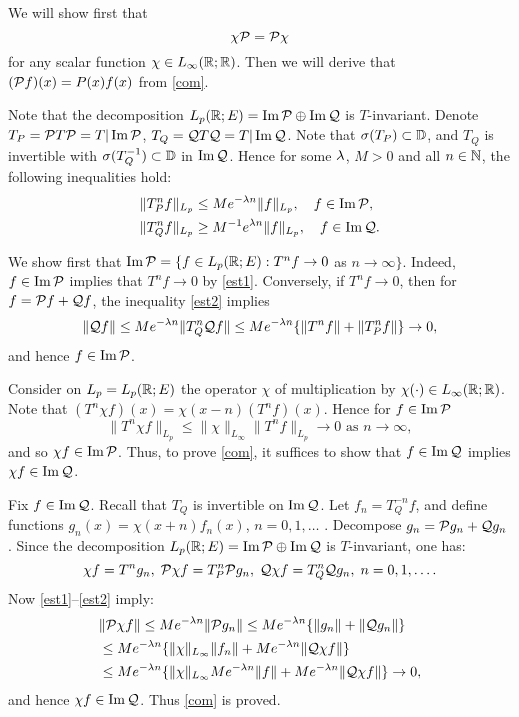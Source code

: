 \begin{pf}
We will show first that
\begin{equation}
\chi \calP =\calP\chi
\lb{com}
\end{equation}
for any scalar function $\chi \in L_\infty ({\Bbb{R}}; {\Bbb{R}})$.
Then we will derive
that $({\cal{P}} f)(x) =P(x)f(x)$ from \eqref{com}.

Note that the
decomposition $L_p({\Bbb{R}};E)=\operatorname{Im} {\cal{P}} \oplus \operatorname{Im} {\cal{Q}}$ is $T$-invariant.
Denote $T_P ={\cal{P}} T{\cal{P}} =T| \operatorname{Im} {\cal{P}}$,
$T_Q ={\cal{Q}} T{\cal{Q}}=T| \operatorname{Im} {\cal{Q}}$.  Note that
$\sigma (T_P) \subset {\Bbb{D}}$, and $T_Q$ is invertible with $\sigma
(T^{-1}_Q) \subset {\Bbb{D}}$ in $\operatorname{Im} {\cal{Q}}$.
Hence for some $\lambda$, $M> 0$ and all $n\in {\Bbb{N}}$,
the following inequalities hold:
\begin{align}
\| T_P^n f\|_{L_p} & \leq Me^{-\lam n} \|f\|_{L_p}, \quad f\in \Im \calP,
\lb{est1}\\
\| T_Q^n f\|_{L_p} & \geq M^{-1} e^{\lam n} \| f\|_{L_p}, \quad f\in \Im
\calQ.
\lb{est2}
\end{align}

We show first that $\operatorname{Im} {\cal{P}} =\{f\in L_p ({\Bbb{R}};E): T^n f\to 0$ as $n\to
\infty\}$.  Indeed, $f\in \operatorname{Im} {\cal{P}}$ implies that
$T^n f\to 0$ by \eqref{est1}.
Conversely, if $T^n f\to 0$, then for
$f={\cal{P}} f +{\cal{Q}} f$, the inequality \eqref{est2} implies
$$
\| {\cal{Q}} f\| \leq Me^{-\lambda n} \| T_Q^n {\cal{Q}} f\|
\leq Me^{-\lambda n} \{\|T^n f\| +\|
T^n_P f\|\}\to 0,
$$
and hence $f\in \operatorname{Im} {\cal{P}}$.

Consider on $L_p=L_p({\Bbb{R}};E)$ the
operator $\chi$ of multiplication by $\chi (\cdot ) \in L_\infty
({\Bbb{R}};{\Bbb{R}})$.  Note that $(T^n \chi f)(x) =\chi (x-n)(T^n f)(x)$. Hence
for $f\in \operatorname{Im} {\cal{P}}$
$$
\| T^n \chi f\|_{L_p}
\leq \| \chi\|_{L_\infty} \| T^n f\|_{L_p} \to 0 \mbox{ as } n
\to \infty,
$$
and so $\chi f \in \operatorname{Im} {\cal{P}}$.  Thus,
to prove \eqref{com}, it suffices to show that
$f\in \operatorname{Im} {\cal{Q}}$ implies $\chi f \in \operatorname{Im} {\cal{Q}}$.

Fix $f\in \operatorname{Im} {\cal{Q}}$.  Recall that $T_Q$ is invertible on $\operatorname{Im} {\cal{Q}}$.  Let
$f_n =T^{-n}_Q f$, and define functions $g_n (x) =\chi (x+n) f_n
(x)$, $n=0,1,\ldots$ .  Decompose $g_n ={\cal{P}} g_n +{\cal{Q}} g_n$.
Since the decomposition
$L_p({\Bbb{R}};E) =\operatorname{Im} {\cal{P}} \oplus \operatorname{Im} {\cal{Q}}$ is $T$-invariant, one has:
$$
\chi f =T^n g_n, \; {\cal{P}}\chi f =T^n_P {\cal{P}} g_n, \;
{\cal{Q}}\chi f =T^n_Q {\cal{Q}} g_n, \;
n=0,1,\ldots.
$$
Now \eqref{est1}--\eqref{est2} imply:
\begin{align*}
&\| {\cal{P}}\chi f\| \leq Me^{-\lambda n} \| {\cal{P}} g_n\|
\leq Me^{-\lambda n} \{ \| g_n\|
+\| {\cal{Q}} g_n\| \} \\
& \leq Me^{-\lambda n} \{ \| \chi \|_{L_\infty} \|f_n \| +Me^{-\lambda n}
\|{\cal{Q}}\chi f\|\}\\
& \leq Me^{-\lambda n} \{ \| \chi\|_{L_\infty} Me^{-\lambda n} \|f\|+Me^{-\lambda n}
\|{\cal{Q}} \chi f\| \} \to 0,
\end{align*}
and hence $\chi f \in \operatorname{Im} {\cal{Q}}$. Thus \eqref{com} is proved.


\end{pf}

